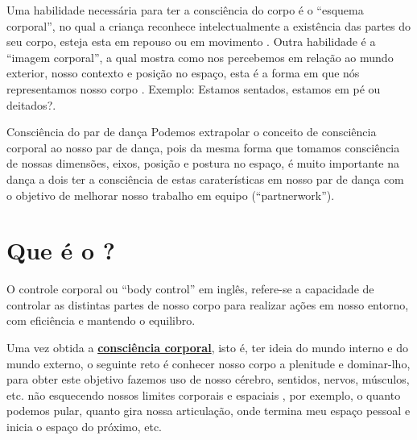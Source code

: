 Uma habilidade necessária para ter a consciência do corpo é o ``esquema corporal'',
no qual a criança reconhece intelectualmente a existência das partes do seu corpo,
esteja esta em repouso ou em movimento
\cite{bueno2016psicomotricidade} \cite[pp. 24]{checa1999desarrollo}.
Outra habilidade é a ``imagem corporal'', 
a qual mostra como nos percebemos em relação ao mundo exterior,
nosso contexto e posição no espaço, esta é a forma em que nós representamos nosso corpo \cite[pp. 22-23, 27]{da2003imagem}.
Exemplo: Estamos sentados, estamos em pé ou deitados?.

\begin{tcbinformation}{Consciência do par de dança}
Podemos extrapolar o conceito de consciência corporal ao nosso par de dança,
pois da mesma forma que tomamos consciência de nossas dimensões, eixos, posição e postura no espaço,
é muito importante na dança a dois ter a consciência de estas caraterísticas em nosso par de dança
com o objetivo de melhorar nosso trabalho em equipo (``partnerwork'').
\end{tcbinformation}

\section{Que é o \bodycontrol?}
\label{sec:BodyControl}

 O controle corporal ou ``body control'' em inglês, refere-se a capacidade
 de controlar as distintas partes de nosso corpo para realizar ações em nosso entorno, com eficiência e 
 mantendo o equilibro. 

Uma vez obtida a \hyperref[sec:BodyAwareness]{\textbf{consciência corporal}},
isto é, ter ideia do mundo interno e do mundo externo, 
o seguinte reto é conhecer nosso corpo a plenitude e dominar-lho, 
para obter este objetivo fazemos uso de nosso cérebro, sentidos, nervos, músculos, etc. 
não esquecendo nossos limites corporais e espaciais
\cite[pp. 14]{bolio2006fantasia}
\cite[pp. 27]{smith2011desarrollo},
por exemplo, o quanto podemos pular, quanto gira nossa articulação, onde termina meu espaço pessoal e inicia o espaço do próximo, etc.

